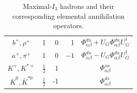 \begin{table}
\begin{center}
\begin{tabular}{|c|c|r|r|c|}
            $b^+, \rho^+$ & 1 & 0 & 1 &
            $\Phi_{\alpha\beta}^{du}+U_G\Phi_{\alpha\beta}^{du}U_G^\dagger$ \\
            $a^+, \pi^+$ & 1 & 0 & $-1$ &
            $\Phi_{\alpha\beta}^{du}-U_G\Phi_{\alpha\beta}^{du}U_G^\dagger$ \\
            $K^+, K^{*+}$ & $\frac{1}{2}$ & 1 & & $\Phi_{\alpha\beta}^{su}$ \\
            $\overline{K}^0, \overline{K}^{*0}$ & $\frac{1}{2}$ & -1 & & $\Phi_{\alpha\beta}^{ds}$ \\
            \hline
          \end{tabular}
        \end{center}
        \caption{Maximal-$I_3$ hadrons and their corresponding elemental annihilation operators.}
        \label{table:hadron_flavor_structure}
      \end{table}
    
